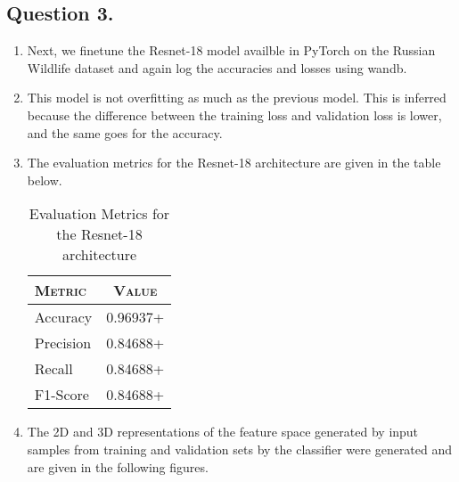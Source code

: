 \documentclass[10pt]{article}
\begin{document}
    \subsection*{\textbf{Question 3.}}
    \begin{enumerate}[label=(\alph*)]
        \item Next, we finetune the Resnet-18 model availble in PyTorch on the
        Russian Wildlife dataset and again log the accuracies and losses using wandb.
        \item This model is not overfitting as much as the previous model. This is
        inferred because the difference between the training loss and validation loss
        is lower, and the same goes for the accuracy.
        \item The evaluation metrics for the Resnet-18 architecture are given in the table below.
        \begin{table}[h!]
            \centering
            \begin{tabular}{l|c}
                \textsc{Metric} & \textsc{Value} \\
                \hline
                Accuracy & 0.96937+ \\
                Precision & 0.84688+ \\
                Recall & 0.84688+ \\
                F1-Score & 0.84688+
            \end{tabular}
            \caption{Evaluation Metrics for the Resnet-18 architecture}
        \end{table}
        \item The 2D and 3D representations of the feature space generated by
        input samples from training and validation sets by the classifier were generated
        and are given in the following figures.
    \end{enumerate}
\end{document}
